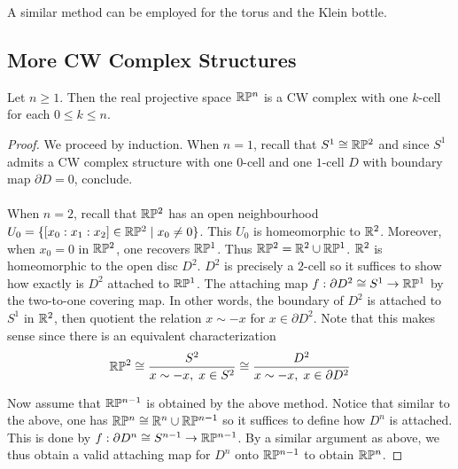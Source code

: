 \documentclass[a4paper]{article}
\begin{document}
A similar method can be employed for the torus and the Klein bottle. 

\subsection{More CW Complex Structures}
\begin{prp}{}{} Let $n\geq 1$. Then the real projective space $\mathbb{R}\mathbb{P}^n$ is a CW complex with one $k$-cell for each $0\leq k\leq n$. \tcbline
\begin{proof}
We proceed by induction. When $n=1$, recall that $S^1\cong\mathbb{R}\mathbb{P}^2$ and since $S^1$ admits a CW complex structure with one $0$-cell and one $1$-cell $D$ with boundary map $\partial D=0$, conclude. \\~\\

When $n=2$, recall that $\mathbb{R}\mathbb{P}^2$ has an open neighbourhood $U_0=\{[x_0:x_1:x_2]\in\mathbb{R}\mathbb{P}^2\;|\;x_0\neq 0\}$. This $U_0$ is homeomorphic to $\mathbb{R}^2$. Moreover, when $x_0=0$ in $\mathbb{R}\mathbb{P}^2$, one recovers $\mathbb{R}\mathbb{P}^1$. Thus $\mathbb{R}\mathbb{P}^2=\mathbb{R}^2\cup\mathbb{R}\mathbb{P}^1$. $\mathbb{R}^2$ is homeomorphic to the open disc $D^2$. $D^2$ is precisely a $2$-cell so it suffices to show how exactly is $D^2$ attached to $\mathbb{R}\mathbb{P}^1$. The attaching map $f:\partial D^2\cong S^1\to\mathbb{R}\mathbb{P}^1$ by the two-to-one covering map. In other words, the boundary of $D^2$ is attached to $S^1$ in $\mathbb{R}^2$, then quotient the relation $x\sim-x$ for $x\in\partial D^2$. Note that this makes sense since there is an equivalent characterization $$\mathbb{R}\mathbb{P}^2\cong\frac{S^2}{x\sim-x,\;x\in S^2}\cong\frac{D^2}{x\sim-x,\;x\in\partial D^2}$$

Now assume that $\mathbb{R}\mathbb{P}^{n-1}$ is obtained by the above method. Notice that similar to the above, one has $\mathbb{R}\mathbb{P}^n\cong\mathbb{R}^n\cup\mathbb{R}\mathbb{P}^{n-1}$ so it suffices to define how $D^n$ is attached. This is done by $f:\partial D^n\cong S^{n-1}\to\mathbb{R}\mathbb{P}^{n-1}$. By a similar argument as above, we thus obtain a valid attaching map for $D^n$ onto $\mathbb{R}\mathbb{P}^{n-1}$ to obtain $\mathbb{R}\mathbb{P}^n$. 
\end{proof}
\end{prp}
\end{document}
